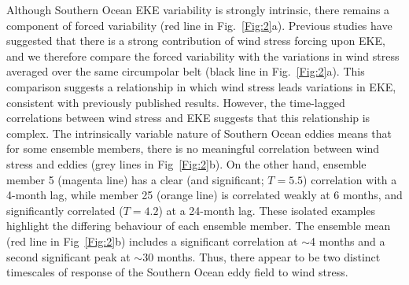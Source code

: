 \documentclass{agujournal2019}
\begin{document}
Although Southern Ocean EKE variability is strongly intrinsic, there remains a component of forced variability (red line in Fig.~\ref{Fig:2}a).
Previous studies have suggested that there is a strong contribution of wind stress forcing upon EKE, and we therefore compare the forced variability with the variations in wind stress averaged over the same circumpolar belt (black line in Fig.~\ref{Fig:2}a).
This comparison suggests a relationship in which wind stress leads variations in EKE, consistent with previously published results.
However, the time-lagged correlations between wind stress and EKE suggests that this relationship is complex. 
The intrinsically variable nature of Southern Ocean eddies means that for some ensemble members, there is no meaningful correlation between wind stress and eddies (grey lines in Fig~\ref{Fig:2}b).
On the other hand, ensemble member 5 (magenta line) has a clear (and significant; $T = 5.5$) correlation with a 4-month lag, while member 25 (orange line) is correlated weakly at 6 months, and significantly correlated ($T = 4.2$) at a 24-month lag.
These isolated examples highlight the differing behaviour of each ensemble member. 
The ensemble mean (red line in Fig~\ref{Fig:2}b) includes a significant correlation at $\sim$4 months and a second significant peak at $\sim$30 months.
Thus, there appear to be two distinct timescales of response of the Southern Ocean eddy field to wind stress. 
\end{document}
